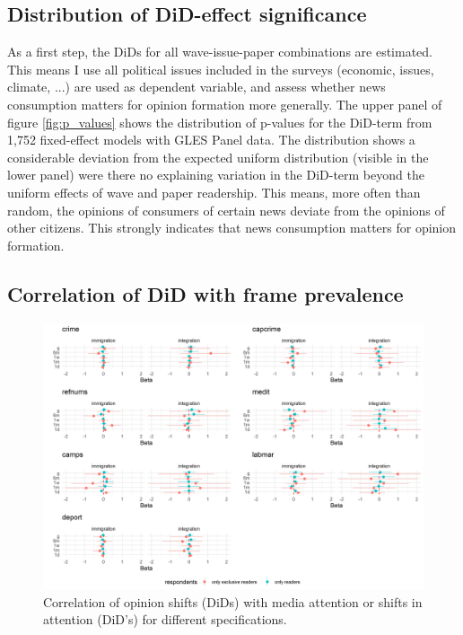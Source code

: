 \documentclass{article}
\begin{document}
\subsection{Distribution of DiD-effect significance}

As a first step, the DiDs for all wave-issue-paper combinations are estimated. This means I use all political issues included in the surveys (economic, issues, climate, ...) are used as dependent variable, and assess whether news consumption matters for opinion formation more generally. The upper panel of figure \ref{fig:p_values} shows the distribution of p-values for the DiD-term from 1,752 fixed-effect models with GLES Panel data. The distribution shows a considerable deviation from the expected uniform distribution (visible in the lower panel) were there no explaining variation in the DiD-term beyond the uniform effects of wave and paper readership. This means, more often than random, the opinions of consumers of certain news deviate from the opinions of other citizens. This strongly indicates that news consumption matters for opinion formation.




\subsection{Correlation of DiD with frame prevalence}
\begin{figure}[!ht]
    \centering
    \includegraphics[width=\textwidth]{paper/vis/effectplot_frames.png}
    \caption{Correlation of opinion shifts (DiDs) with media attention or shifts in attention (DiD's) for different specifications.}
    \label{fig:did_corr}
\end{figure}
\end{document}
